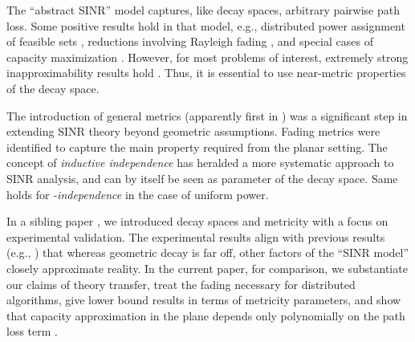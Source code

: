 \documentclass[11pt]{amsart}
\begin{document}
\iffalse On the other hand, allowing for \emph{arbitrary} path loss results in
 computational problems with extremely strong approximation hardness
 results \cite{GHWW09,Hastad}.  This places algorithmic research in the
 quandary of choosing between intractability or lack of fidelity.

\textbf{Future considerations}
\begin{itemize}
\item Temporality: Most likely built on top of a static component 
\item Randomization: Adapting algorithmic models to (the remaining) unpredictability
\medskip

\item Dynamic environments: Only static here; dynamic part is beyond
  scope, it will typically involve static components; hold when environment is not changing.
\end{itemize}
\fi

The ``abstract SINR'' model captures, like decay spaces, arbitrary pairwise path loss. Some positive results hold in that model, e.g., 
distributed power assignment of feasible sets \cite{LotkerPPP11},
reductions involving Rayleigh fading \cite{Dams2012}, and 
special cases of capacity maximization \cite{us:algosensors11}.
However, for most problems of interest, extremely strong inapproximability results hold \cite{GHWW09,khot2006better}. 
Thus, it is essential to use near-metric properties of the decay space.

The introduction of general metrics (apparently first in
\cite{FKV09,FKRV09}) was a significant step in extending SINR theory
beyond geometric assumptions.
Fading metrics \cite{us:talg12} were identified to capture the main
property required from the planar setting.
The concept of \emph{inductive independence} \cite{KV10,hoeferspaa}
has heralded a more systematic approach to SINR analysis, and can by
itself be seen as parameter of the decay space. 
Same holds for \emph{-independence} \cite{infocom11,dams2013sleeping}
in the case of uniform power.

In a sibling paper \cite{us:ICDCS14}, we introduced decay spaces and
metricity with a focus on experimental validation.
The experimental results align with previous results (e.g., 
\cite{son2006,MaheshwariJD2008,chen2010,sevani2012sir}) that
whereas geometric decay is far off, other factors of the ``SINR
model'' closely approximate reality.
In the current paper, for comparison, we substantiate our claims 
of theory transfer, 
treat the fading necessary for distributed algorithms, give lower
bound results in terms of metricity parameters, and show that capacity
approximation in the plane depends only polynomially on the path loss 
term .
\end{document}
